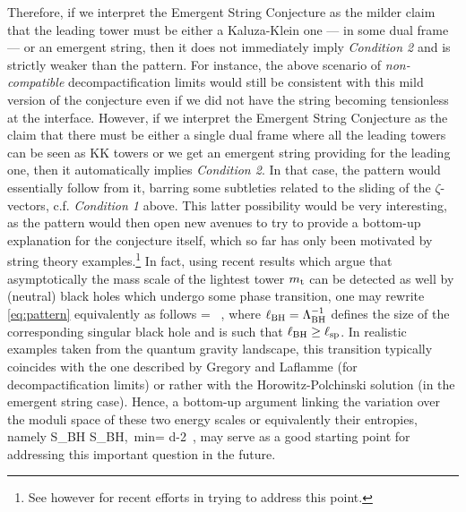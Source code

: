 Therefore, if we interpret the Emergent String Conjecture as the milder claim that the leading tower must be either a Kaluza-Klein one --- in some dual frame --- or an emergent string, then it does not immediately imply \emph{Condition 2} and is strictly weaker than the pattern. For instance, the above scenario of \emph{non-compatible} decompactification limits would still be consistent with this mild version of the conjecture even if we did not have the string becoming tensionless at the interface. However, if we interpret the Emergent String Conjecture as the claim that there must be either a single dual frame where all the leading towers can be seen as KK towers or we get an emergent string providing for the leading one, then it automatically implies \emph{Condition 2}. In that case, the pattern would essentially follow from it, barring some subtleties related to the sliding of the $\zeta$-vectors, c.f. \emph{Condition 1} above. This latter possibility would be very interesting, as the pattern would then open new avenues to try to provide a bottom-up explanation for the conjecture itself, which so far has only been motivated by string theory examples.\footnote{See \cite{Basile:2023blg,Basile:2024dqq,Bedroya:2024ubj} however for recent efforts in trying to address this point.} %
In fact, using recent results \cite{Bedroya:2024uva} which argue that asymptotically the mass scale of the lightest tower $m_{\rm t}$ can be detected as well by (neutral) black holes which undergo some phase transition, one may rewrite \eqref{eq:pattern} equivalently as follows
%
\beq\label{eq:patternblackholes}
	 \cdot\frac{\vec\nabla \LSP}{\LSP}= \, ,
\eeq
%
where $\ell_{\rm BH} = \Lambda_{\rm BH}^{-1}$ defines the size of the corresponding singular black hole and is such that $\ell_{\rm BH} \geq \ell_{\rm sp}$. In realistic examples taken from the quantum gravity landscape, this transition typically coincides with the one described by Gregory and Laflamme \cite{Gregory:1993vy,Gregory:1994bj} (for decompactification limits) or rather with the Horowitz-Polchinski solution \cite{Horowitz:1996nw,Horowitz:1997jc} (in the emergent string case). Hence, a bottom-up argument linking the variation over the moduli space of these two energy scales or equivalently their entropies, namely
%
\beq\label{eq:patternentropies}
	\vec\nabla \log S_{\rm BH} \cdot \vec \nabla S_{\rm BH,\, min}= d-2\, ,
\eeq
%
may serve as a good starting point for addressing this important question in the future.


